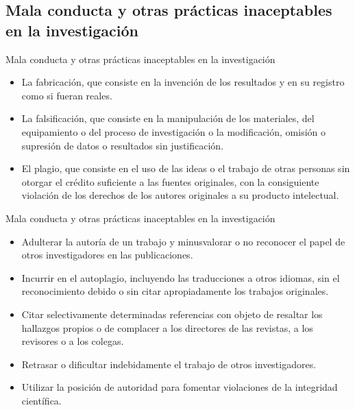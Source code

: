\subsection{Mala conducta y otras prácticas inaceptables en la investigación}
\begin{frame}{Mala conducta y otras prácticas inaceptables en la investigación}
    \begin{itemize}
        \item La fabricación, que consiste en la invención de los resultados y en su registro como si fueran
        reales.
        \item La falsificación, que consiste en la manipulación de los materiales, del equipamiento o del proceso
        de investigación o la modificación, omisión o supresión de datos o resultados sin justificación.
        \item El plagio, que consiste en el uso de las ideas o el trabajo de otras personas sin otorgar el crédito
        suficiente a las fuentes originales, con la consiguiente violación de los derechos de los autores
        originales a su producto intelectual.
    \end{itemize}
\end{frame}
\begin{frame}{Mala conducta y otras prácticas inaceptables en la investigación}
    \begin{itemize}
        \item Adulterar la autoría de un trabajo y minusvalorar o no reconocer el papel de otros investigadores
        en las publicaciones.
        \item Incurrir en el autoplagio, incluyendo las traducciones a otros idiomas, sin el reconocimiento
        debido o sin citar apropiadamente los trabajos originales.
        \item Citar selectivamente determinadas referencias con objeto de resaltar los hallazgos propios o de
        complacer a los directores de las revistas, a los revisores o a los colegas.
        \item Retrasar o dificultar indebidamente el trabajo de otros investigadores.
        \item Utilizar la posición de autoridad para fomentar violaciones de la integridad científica.
    \end{itemize}
\end{frame}
